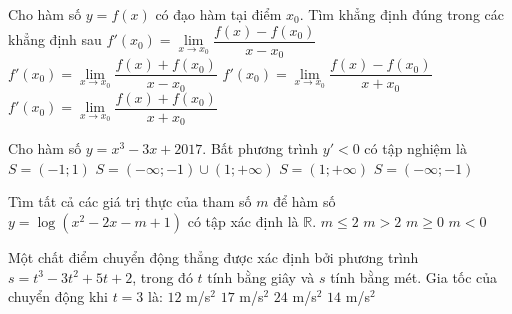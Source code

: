 \begin{ex}%
	Cho hàm số $y=f(x)$ có đạo hàm tại điểm $x_0$. Tìm khẳng định đúng trong các  khẳng định sau
	\choice 
		{\True  $f'(x_0)=\lim\limits_{x\to x_0}\dfrac{f(x)-f(x_0)}{x-x_0}$}
		{$f'(x_0)=\lim\limits_{x\to x_0}\dfrac{f(x)+f(x_0)}{x-x_0}$} 
		 {$f'(x_0)=\lim\limits_{x\to x_0}\dfrac{f(x)-f(x_0)}{x+x_0}$}
		{$f'(x_0)=\lim\limits_{x\to  x_0}\dfrac{f(x)+f(x_0)}{x+x_0}$}
\end{ex}

\begin{ex}%
	Cho hàm số $y=x^3-3x+2017$. Bất phương trình $y' < 0$  có tập nghiệm là
	\choice 
		{\True $S=\left(-1;1\right)$} 
		 {$S=\left(-\infty;-1\right)\cup \left(1;+\infty \right)$}
		{$S=\left(1;+\infty \right)$} 
		{$S=\left(-\infty;-1\right)$} 
\end{ex}

\begin{ex}%
	Tìm tất cả các giá trị thực của tham số $m$ để hàm  số $y=\log \left(x^2-2x-m+1\right)$ có tập xác định là $\mathbb{R}$.
	 \choice
		{$m\le  2$}
		{$m  > 2$}
		{$m\ge  0$}
		{\True $m  < 0$}
\end{ex}

\begin{ex}%
	Một chất  điểm chuyển động thẳng được xác định bởi phương trình $s=t^3-3t^2+5t+2$, trong đó $t$ tính bằng giây và $s$ tính bằng mét. Gia tốc của chuyển động khi $t=3$ là:
	\choice 
		{\True $12$  m/s$^2$}
		{$17$  m/s$^2$}
		 {$24$ m/s$^2$}
		{$14$ m/s$^2$} 
\end{ex}

